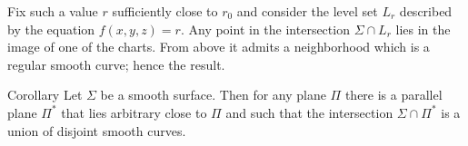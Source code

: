 Fix such a value $r$ sufficiently close to $r_0$ and consider the level set $L_r$ described by the equation $f(x,y,z)=r$.
Any point in the intersection $\Sigma\cap L_r$ lies in the image of one of the charts.
From above it admits a neighborhood which is a regular smooth curve;
hence the result.\qeds

\begin{thm}{Corollary}
Let $\Sigma$ be a smooth surface.
Then for any plane $\Pi$ there is a parallel plane $\Pi^{*}$ that lies arbitrary close to $\Pi$ and such that the intersection $\Sigma\cap\Pi^{*}$ is a union of disjoint smooth curves.
\end{thm}



